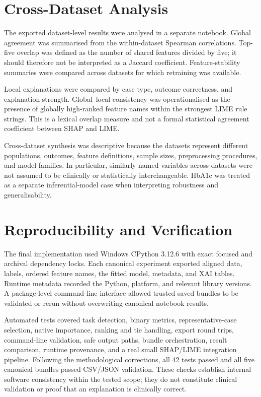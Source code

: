 \section{Cross-Dataset Analysis}

The exported dataset-level results were analysed in a separate notebook. Global agreement was summarised from the within-dataset Spearman correlations. Top-five overlap was defined as the number of shared features divided by five; it should therefore not be interpreted as a Jaccard coefficient. Feature-stability summaries were compared across datasets for which retraining was available.

Local explanations were compared by case type, outcome correctness, and explanation strength. Global--local consistency was operationalised as the presence of globally high-ranked feature names within the strongest LIME rule strings. This is a lexical overlap measure and not a formal statistical agreement coefficient between SHAP and LIME.

Cross-dataset synthesis was descriptive because the datasets represent different populations, outcomes, feature definitions, sample sizes, preprocessing procedures, and model families. In particular, similarly named variables across datasets were not assumed to be clinically or statistically interchangeable. HbA1c was treated as a separate inferential-model case when interpreting robustness and generalisability.

\section{Reproducibility and Verification}

The final implementation used Windows CPython 3.12.6 with exact focused and archival dependency locks. Each canonical experiment exported aligned data, labels, ordered feature names, the fitted model, metadata, and XAI tables. Runtime metadata recorded the Python, platform, and relevant library versions. A package-level command-line interface allowed trusted saved bundles to be validated or rerun without overwriting canonical notebook results.

Automated tests covered task detection, binary metrics, representative-case selection, native importance, ranking and tie handling, export round trips, command-line validation, safe output paths, bundle orchestration, result comparison, runtime provenance, and a real small SHAP/LIME integration pipeline. Following the methodological corrections, all 42 tests passed and all five canonical bundles passed CSV/JSON validation. These checks establish internal software consistency within the tested scope; they do not constitute clinical validation or proof that an explanation is clinically correct.

